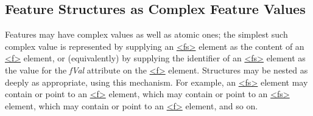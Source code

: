 \subsection[{Feature Structures as Complex Feature Values}]{Feature Structures as Complex Feature Values}\label{FSST}\par
Features may have complex values as well as atomic ones; the simplest such complex value is represented by supplying an \hyperref[TEI.fs]{<fs>} element as the content of an \hyperref[TEI.f]{<f>} element, or (equivalently) by supplying the identifier of an \hyperref[TEI.fs]{<fs>} element as the value for the {\itshape fVal} attribute on the \hyperref[TEI.f]{<f>} element. Structures may be nested as deeply as appropriate, using this mechanism. For example, an \hyperref[TEI.fs]{<fs>} element may contain or point to an \hyperref[TEI.f]{<f>} element, which may contain or point to an \hyperref[TEI.fs]{<fs>} element, which may contain or point to an \hyperref[TEI.f]{<f>} element, and so on.\par
